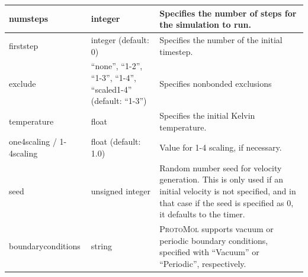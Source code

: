 \documentclass[11pt]{report}
\newcommand{\ProtoMol}{\textsc{ProtoMol }}
\begin{document}
\begin{tabular}{|p{5.5cm}|p{4cm}|p{6cm}|}


    numsteps &
    integer &
    Specifies the number of steps for the simulation to run. \\\hline


    firststep &
    integer (default: 0) &
    Specifies the number of the initial timestep.  \\\hline


    exclude &
    ``none'', ``1-2'', ``1-3'', ``1-4'', ``scaled1-4'' (default: ``1-3'') &
    Specifies nonbonded exclusions \\\hline


    temperature &
    float &
    Specifies the initial Kelvin temperature. \\\hline

    
    one4scaling / 1-4scaling &
    float (default: 1.0) &
    Value for 1-4 scaling, if necessary. \\\hline


    seed &
    unsigned integer &
    Random number seed for velocity generation.  This is only used if an initial
    velocity is not specified, and in that case if the seed is specified as 0,
    it defaults to the timer. \\\hline


    boundaryconditions &
    string &
    \ProtoMol supports vacuum or periodic boundary conditions, specified with ``Vacuum'' or ``Periodic'', respectively. \\\hline


  \end{tabular}
  \newpage
\end{document}
